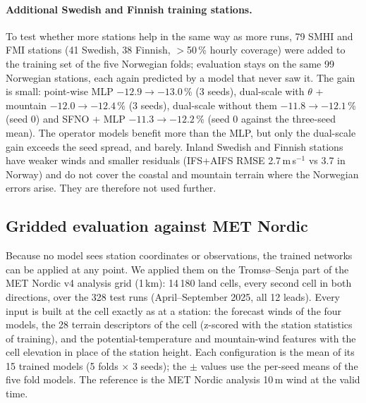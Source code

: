 \documentclass[10pt,a4paper]{article}
\begin{document}
\paragraph{Additional Swedish and Finnish training stations.} To test whether more stations help in
the same way as more runs, 79 SMHI and FMI stations (41 Swedish, 38 Finnish, $>$50\,\% hourly
coverage) were added to the training set of the five Norwegian folds; evaluation stays on the same 99
Norwegian stations, each again predicted by a model that never saw it. The gain is small: point-wise MLP
$-12.9\to-13.0$\,\% (3 seeds), dual-scale with $\theta$ + mountain $-12.0\to-12.4$\,\% (3 seeds),
dual-scale without them $-11.8\to-12.1$\,\% (seed 0) and SFNO + MLP $-11.3\to-12.2$\,\% (seed 0
against the three-seed mean). The operator
models benefit more than the MLP, but only the dual-scale gain exceeds the seed spread, and barely.
Inland Swedish and Finnish stations have weaker winds and smaller residuals (IFS+AIFS RMSE
2.7\,m\,s$^{-1}$ vs 3.7 in Norway) and do not cover the coastal and mountain terrain where the Norwegian
errors arise. They are therefore not used further.

\subsection{Gridded evaluation against MET Nordic}\label{sec:metnordic}
Because no model sees station coordinates or observations, the trained networks can be applied at
any point. We applied them on the Troms{\o}--Senja part of the MET Nordic v4 analysis grid
(1\,km): 14\,180 land cells, every second cell in both directions, over the 328 test runs
(April--September 2025, all 12 leads). Every input is built at the cell exactly as at a station:
the forecast winds of the four models, the 28 terrain descriptors of the cell (z-scored with the
station statistics of training), and the potential-temperature and mountain-wind features with the
cell elevation in place of the station height. Each configuration is the mean of its 15 trained
models (5 folds $\times$ 3 seeds); the $\pm$ values use the per-seed means of the five fold models.
The reference is the MET Nordic analysis 10\,m wind at the valid time.
\end{document}

